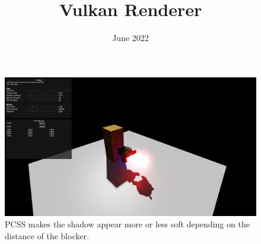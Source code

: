\documentclass[8pt]{article}
\title {\textbf{Vulkan Renderer}}
\date{June 2022}
\begin{document}
		\maketitle

		\begin{figure}[h!]
			\includegraphics[width=\linewidth]{media/screenshot_001.png}
			\caption{PCSS makes the shadow appear more or less soft depending on the distance of the blocker.}
			\label{fig:pcss}
		\end{figure}
\end{document}
